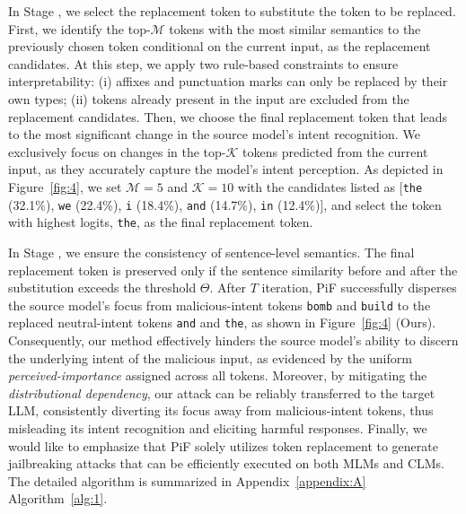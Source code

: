 In Stage \uppercase\expandafter{}, we select the replacement token to substitute the token to be replaced.
First, we identify the top-$\mathcal{M}$ tokens with the most similar semantics to the previously chosen token conditional on the current input, as the replacement candidates. 
At this step, we apply two rule-based constraints to ensure interpretability: 
(i) affixes and punctuation marks can only be replaced by their own types; 
(ii) tokens already present in the input are excluded from the replacement candidates.
Then, we choose the final replacement token that leads to the most significant change in the source model's intent recognition.
We exclusively focus on changes in the top-$\mathcal{K}$ tokens predicted from the current input, as they accurately capture the model's intent perception.
As depicted in Figure~\ref{fig:4}, we set $\mathcal{M} = 5$ and $\mathcal{K} = 10$ with the candidates listed as {[\texttt{the} (32.1\%), \texttt{we} (22.4\%), \texttt{i} (18.4\%), \texttt{and} (14.7\%), \texttt{in} (12.4\%)]}, and select the token with highest logits, \texttt{the}, as the final replacement token.

In Stage \uppercase\expandafter{}, we ensure the consistency of sentence-level semantics.
The final replacement token is preserved only if the sentence similarity before and after the substitution exceeds the threshold $\Theta$. 
After $T$ iteration, PiF successfully disperses the source model's focus from malicious-intent tokens \texttt{bomb} and \texttt{build} to the replaced neutral-intent tokens \texttt{and} and \texttt{the}, as shown in Figure~\ref{fig:4} (Ours).
Consequently, our method effectively hinders the source model's ability to discern the underlying intent of the malicious input, as evidenced by the uniform \emph{perceived-importance} assigned across all tokens.
Moreover, by mitigating the \emph{distributional dependency}, our attack can be reliably transferred to the target LLM, consistently diverting its focus away from malicious-intent tokens, thus misleading its intent recognition and eliciting harmful responses.
Finally, we would like to emphasize that PiF solely utilizes token replacement to generate jailbreaking attacks that can be efficiently executed on both MLMs and CLMs.
The detailed algorithm is summarized in Appendix~\ref{appendix:A} Algorithm~\ref{alg:1}.

\begin{figure*}[t]
    \centering
        \begin{subfigure}
        {
            \texttt{[image: image/Method.png]}
        }
        \end{subfigure}
    \vspace{-0.7em}
    \caption{The procedure of Perceived-importance Flatten (PiF) Method. Source and target \emph{perceived-importance} (PI) are evaluated on Bert-Large and Llama-2-13B-Chat, respectively.}
    \vspace{-1.5em}
    \label{fig:4}
\end{figure*}
